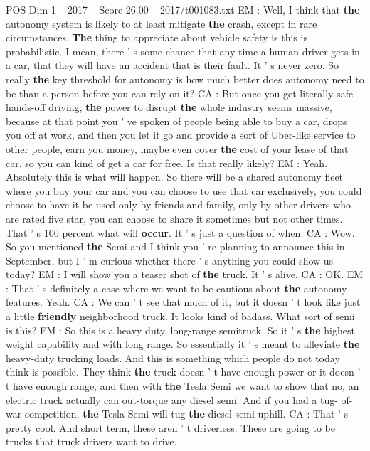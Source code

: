 \begin{textsample}{POS Dim 1 – 2017 – Score 26.00 – 2017/t001083.txt}
EM : Well, I think that \textbf{the} autonomy system is likely to at least mitigate \textbf{the} crash, except in rare circumstances. \textbf{The} thing to appreciate about vehicle safety is this is probabilistic.
I mean, there ' s some chance that any time a human driver gets in a car, that they will have an accident that is their fault.
It ' s never zero.
So really \textbf{the} key threshold for autonomy is how much better does autonomy need to be than a person before you can rely on it?
CA : But once you get literally safe hands-off driving, \textbf{the} power to disrupt \textbf{the} whole industry seems massive, because at that point you ' ve spoken of people being able to buy a car, drops you off at work, and then you let it go and provide a sort of Uber-like service to other people, earn you money, maybe even cover \textbf{the} cost of your lease of that car, so you can kind of get a car for free.
Is that really likely?
EM : Yeah.
Absolutely this is what will happen.
So there will be a shared autonomy fleet where you buy your car and you can choose to use that car exclusively, you could choose to have it be used only by friends and family, only by other drivers who are rated five star, you can choose to share it sometimes but not other times.
That ' s 100 percent what will \textbf{occur}.
It ' s just a question of when.
CA : Wow.
So you mentioned \textbf{the} Semi and I think you ' re planning to announce this in September, but I ' m curious whether there ' s anything you could show us today?
EM : I will show you a teaser shot of \textbf{the} truck.
It ' s alive.
CA : OK.
EM : That ' s definitely a case where we want to be cautious about \textbf{the} autonomy features.
Yeah.
CA : We can ' t see that much of it, but it doesn ' t look like just a little \textbf{friendly} neighborhood truck.
It looks kind of badass.
What sort of semi is this?
EM : So this is a heavy duty, long-range semitruck.
So it ' s \textbf{the} highest weight capability and with long range.
So essentially it ' s meant to alleviate \textbf{the} heavy-duty trucking loads.
And this is something which people do not today think is possible.
They think \textbf{the} truck doesn ' t have enough power or it doesn ' t have enough range, and then with \textbf{the} Tesla Semi we want to show that no, an electric truck actually can out-torque any diesel semi.
And if you had a tug- of-war competition, \textbf{the} Tesla Semi will tug \textbf{the} diesel semi uphill.
CA : That ' s pretty cool.
And short term, these aren ' t driverless.
These are going to be trucks that truck drivers want to drive.

\end{textsample}
